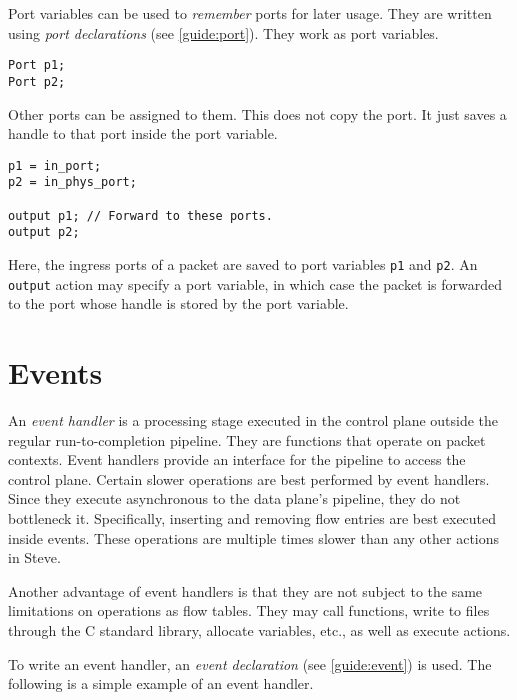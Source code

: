 Port variables can be used to \textit{remember} ports for later usage. They are
written using \textit{port declarations} (see \ref{guide:port}).
They work as port variables.

\begin{codepage}
\begin{lstlisting}
Port p1;
Port p2;
\end{lstlisting}
\end{codepage}

Other ports can be assigned to them. This does not copy the port. It just saves
a handle to that port inside the port variable.

\begin{codepage}
\begin{lstlisting}
p1 = in_port; 
p2 = in_phys_port;

output p1; // Forward to these ports.
output p2;
\end{lstlisting}
\end{codepage}

Here, the ingress ports of a packet are saved to port variables \texttt{p1} and \texttt{p2}. An \texttt{output} action may specify a port variable, in which case the packet is forwarded to the port whose handle is stored by the port variable.

\section{Events} \label{tut:event}

An \textit{event handler} is a processing stage executed in the control plane outside the regular
run-to-completion pipeline. They are
functions that operate on packet contexts. 
Event handlers provide an interface for the pipeline to access the control
plane. Certain slower operations
are best performed by event handlers. Since they execute asynchronous to the
data plane's pipeline, they do not bottleneck it.
Specifically, inserting and removing flow entries are best executed inside
events. These operations are multiple times slower
than any other actions in Steve.

Another advantage of event handlers is that they are not subject to the same
limitations on operations as flow tables. They may call functions,
write to files through the C standard library, allocate variables, etc., as
well as execute actions.

To write an event handler, an \textit{event declaration}
(see \ref{guide:event}) is used. The following is a simple example
of an event handler.

